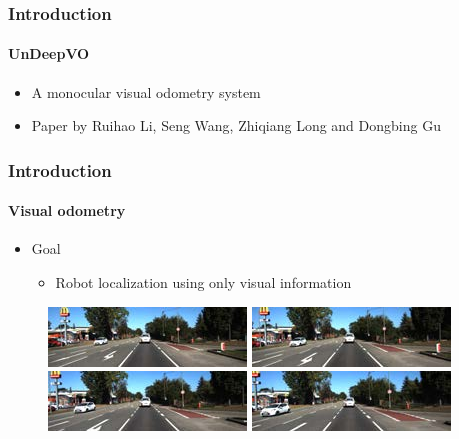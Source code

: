 \begin{frame}
    \frametitle{Introduction}
    \framesubtitle{UnDeepVO}
    \begin{itemize}
        \item A monocular visual odometry system
        \item Paper by Ruihao Li, Seng Wang, Zhiqiang Long and Dongbing Gu
    \end{itemize}
\end{frame}

\begin{frame}
    \frametitle{Introduction}
    \framesubtitle{Visual odometry}
    \begin{itemize}
        \item Goal
        \begin{itemize}
            \item Robot localization using only visual information
        \end{itemize}
    \end{itemize}
    \begin{figure}
        \includegraphics[scale=0.8]{images/road1.png}
        \includegraphics[scale=0.8]{images/road2.png}
        \includegraphics[scale=0.8]{images/road3.png}
        \includegraphics[scale=0.8]{images/road4.png}
    \end{figure}
\end{frame}


